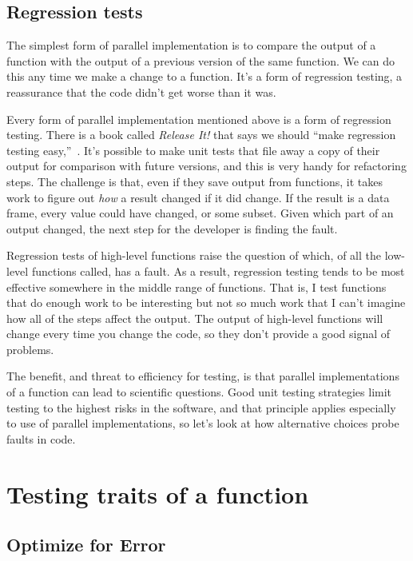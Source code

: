 \documentclass[fleqn,10pt]{olplainarticle}
\begin{document}
\subsection{Regression tests}
The simplest form of parallel implementation is to compare the output
of a function with the output of a previous version of the same
function. We can do this any time we make a change to a function.
It's a form of regression testing, a reassurance that the code
didn't get worse than it was.

Every form of parallel implementation mentioned above is a form
of regression testing.
There is a book called \emph{Release It!} that says we should
``make regression testing easy,''~\citep{nygard2018release}.
It's possible to make unit tests that file away a copy of
their output for comparison with future versions, and this is
very handy for refactoring steps.
The challenge is that, even if
they save output from functions, it takes work to figure out
\emph{how} a result changed if it did change. If the result
is a data frame, every value could have changed, or some subset.
Given which part of an output changed, the next step for the
developer is finding the fault.

Regression tests of high-level functions raise the question
of which, of all the low-level functions called, has a fault.
As a result, regression testing tends to be most effective
somewhere in the middle range of functions. That is, I test
functions that do enough work to be interesting but not so much
work that I can't imagine how all of the steps affect the output.
The output of high-level functions will change every time you
change the code, so they don't provide a good signal of problems.

The benefit, and threat to efficiency for testing, is that
parallel implementations of a function can lead to scientific
questions. Good unit testing strategies limit testing to the
highest risks in the software, and that principle applies
especially to use of parallel implementations, so let's
look at how alternative choices probe faults in code.



\section{Testing traits of a function}

\subsection{Optimize for Error}
\end{document}
